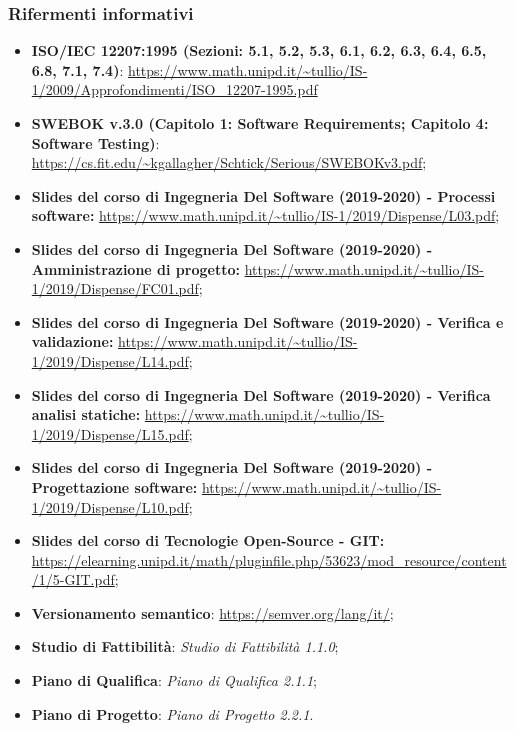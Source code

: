 \subsubsection{Rifermenti informativi}
\begin{itemize}
  \item \textbf{ISO/IEC 12207:1995 (Sezioni: 5.1, 5.2, 5.3, 6.1, 6.2, 6.3, 6.4, 6.5, 6.8,  7.1,  7.4)}: \url{https://www.math.unipd.it/~tullio/IS-1/2009/Approfondimenti/ISO_12207-1995.pdf}
  \item \textbf{SWEBOK v.3.0 (Capitolo 1: Software Requirements; Capitolo 4: Software Testing)}: \url{https://cs.fit.edu/~kgallagher/Schtick/Serious/SWEBOKv3.pdf};
  \item \textbf{Slides del corso di Ingegneria Del Software (2019-2020) - Processi software:} \url{https://www.math.unipd.it/~tullio/IS-1/2019/Dispense/L03.pdf};
  \item \textbf{Slides del corso di Ingegneria Del Software (2019-2020) - Amministrazione di progetto:} \url{https://www.math.unipd.it/~tullio/IS-1/2019/Dispense/FC01.pdf};
  \item \textbf{Slides del corso di Ingegneria Del Software (2019-2020) - Verifica e validazione:} \url{https://www.math.unipd.it/~tullio/IS-1/2019/Dispense/L14.pdf};
  \item \textbf{Slides del corso di Ingegneria Del Software (2019-2020) - Verifica analisi statiche:} \url{https://www.math.unipd.it/~tullio/IS-1/2019/Dispense/L15.pdf};
  \item \textbf{Slides del corso di Ingegneria Del Software (2019-2020) - Progettazione software:}
  \url{  https://www.math.unipd.it/~tullio/IS-1/2019/Dispense/L10.pdf};
  \item \textbf{Slides del corso di Tecnologie Open-Source - GIT:}   \url{  https://elearning.unipd.it/math/pluginfile.php/53623/mod_resource/content/1/5-GIT.pdf};
  \item \textbf{Versionamento semantico}: \url{https://semver.org/lang/it/;}
  \item \textbf{Studio di Fattibilità}: \textit{Studio di Fattibilità 1.1.0\docs};
  \item \textbf{Piano di Qualifica}: \textit{Piano di Qualifica 2.1.1\docs};
  \item \textbf{Piano di Progetto}: \textit{Piano di Progetto 2.2.1\docs}.
\end{itemize}

